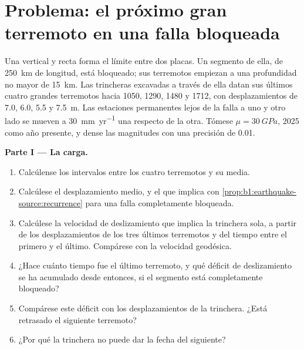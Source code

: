 \section{Problema: el próximo gran terremoto en una falla bloqueada}

\begin{problem}
\label{pb:b1:earthquake-source:1}
Una  vertical y recta forma el límite entre dos placas. Un segmento de ella, de \qty{250}{km} de longitud, está bloqueado; sus
terremotos empiezan a una profundidad no mayor de \qty{15}{km}. Las trincheras excavadas a través de ella datan sus últimos cuatro grandes
terremotos hacia 1050, 1290, 1480 y 1712, con desplazamientos de \num{7.0}, \num{6.0}, \num{5.5} y \qty{7.5}{m}. Las estaciones permanentes
lejos de la falla a uno y otro lado se mueven a \qty{30}{mm.yr^{-1}} una respecto de la otra. Tómese $\mu =
\qty{30}{GPa}$, 2025 como año presente, y dense las magnitudes con una precisión de 0.01.

\medskip
\noindent\textbf{Parte I --- La carga.}
\begin{enumerate}
  \item Calcúlense los intervalos entre los cuatro terremotos y su media.
  \item Calcúlese el desplazamiento medio, y el  que implica con
        \cref{prop:b1:earthquake-source:recurrence} para una falla completamente bloqueada.
  \item Calcúlese la velocidad de deslizamiento que implica la trinchera sola, a partir de los desplazamientos de los tres últimos
        terremotos y del tiempo entre el primero y el último. Compárese con la velocidad geodésica.
  \item ¿Hace cuánto tiempo fue el último terremoto, y qué déficit de deslizamiento se ha acumulado desde entonces, si el segmento está
        completamente bloqueado?
  \item Compárese este déficit con los desplazamientos de la trinchera. ¿Está retrasado el siguiente terremoto?
  \item ¿Por qué la trinchera no puede dar la fecha del siguiente?
\end{enumerate}


\end{problem}
